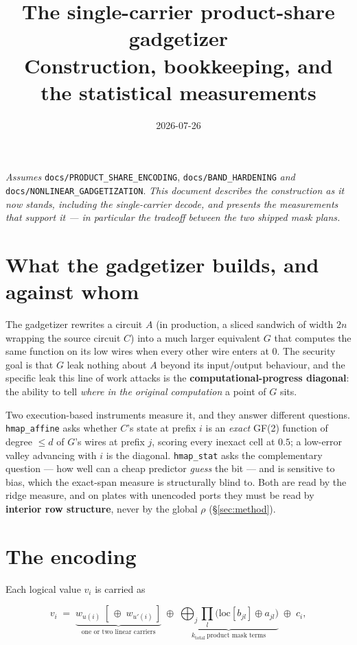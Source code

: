 \documentclass[11pt]{article}
\title{\textbf{The single-carrier product-share gadgetizer}\\[2pt]
\large Construction, bookkeeping, and the statistical measurements}
\author{}
\date{2026-07-26}
\newcommand{\xor}{\oplus}
\newcommand{\code}[1]{\texttt{#1}}
\begin{document}
\maketitle

\noindent\emph{Assumes} \code{docs/PRODUCT\_SHARE\_ENCODING}, \code{docs/BAND\_HARDENING}
\emph{and} \code{docs/NONLINEAR\_GADGETIZATION}. \emph{This document describes the
construction as it now stands, including the single-carrier decode, and
presents the measurements that support it --- in particular the tradeoff
between the two shipped mask plans.}

\section{What the gadgetizer builds, and against whom}

The gadgetizer rewrites a circuit $A$ (in production, a sliced sandwich of
width $2n$ wrapping the source circuit $C$) into a much larger equivalent $G$
that computes the same function on its low wires when every other wire enters
at $0$. The security goal is that $G$ leak nothing about $A$ beyond its
input/output behaviour, and the specific leak this line of work attacks is the
\textbf{computational-progress diagonal}: the ability to tell \emph{where in
the original computation} a point of $G$ sits.

Two execution-based instruments measure it, and they answer different
questions. \code{hmap\_affine} asks whether $C$'s state at prefix $i$ is an
\emph{exact} GF(2) function of degree $\le d$ of $G$'s wires at prefix $j$,
scoring every inexact cell at $0.5$; a low-error valley advancing with $i$ is
the diagonal. \code{hmap\_stat} asks the complementary question --- how well
can a cheap predictor \emph{guess} the bit --- and is sensitive to bias, which
the exact-span measure is structurally blind to. Both are read by the ridge
measure, and on plates with unencoded ports they must be read by
\textbf{interior row structure}, never by the global $\rho$
(\S\ref{sec:method}).

\section{The encoding}

Each logical value $v_i$ is carried as

\begin{equation}
v_i \;=\; \underbrace{w_{u(i)} \;[\,\xor\; w_{u'(i)}\,]}_{\text{one or two linear carriers}}
\;\xor\; \underbrace{\bigoplus_{j} \prod_{l} \bigl(\mathrm{loc}[b_{jl}] \xor a_{jl}\bigr)}_{k_{\mathrm{total}}\ \text{product mask terms}}
\;\xor\; c_i ,
\label{eq:decode}
\end{equation}
\end{document}
